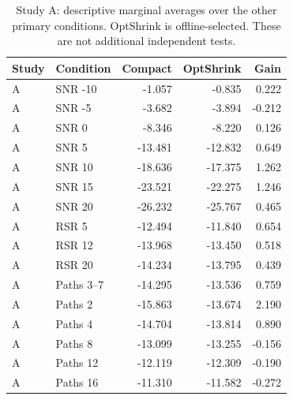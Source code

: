 \begin{table}[!t]
\caption{Study A: descriptive marginal averages over the other primary conditions. OptShrink is offline-selected. These are not additional independent tests.}
\label{tab:marginal-A}\centering\footnotesize
\setlength{\tabcolsep}{4pt}
\begin{tabular}{@{}llrrr@{}}\toprule
Study & Condition & Compact & OptShrink & Gain\\
\midrule
A & SNR -10 & -1.057 & -0.835 & 0.222\\
A & SNR -5 & -3.682 & -3.894 & -0.212\\
A & SNR 0 & -8.346 & -8.220 & 0.126\\
A & SNR 5 & -13.481 & -12.832 & 0.649\\
A & SNR 10 & -18.636 & -17.375 & 1.262\\
A & SNR 15 & -23.521 & -22.275 & 1.246\\
A & SNR 20 & -26.232 & -25.767 & 0.465\\
A & RSR 5 & -12.494 & -11.840 & 0.654\\
A & RSR 12 & -13.968 & -13.450 & 0.518\\
A & RSR 20 & -14.234 & -13.795 & 0.439\\
A & Paths 3--7 & -14.295 & -13.536 & 0.759\\
A & Paths 2 & -15.863 & -13.674 & 2.190\\
A & Paths 4 & -14.704 & -13.814 & 0.890\\
A & Paths 8 & -13.099 & -13.255 & -0.156\\
A & Paths 12 & -12.119 & -12.309 & -0.190\\
A & Paths 16 & -11.310 & -11.582 & -0.272\\
\bottomrule
\end{tabular}
\end{table}


